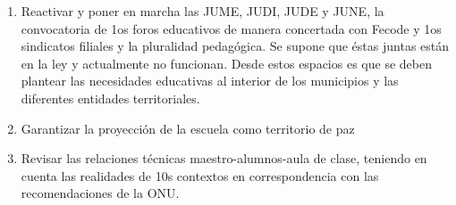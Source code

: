 \documentclass[10pt,twoside]{article}
\begin{document}
\begin{enumerate}
\begin{enumerate}
\item Reactivar y poner en marcha las JUME, JUDI, JUDE y JUNE, la
convocatoria de 1os foros educativos de manera concertada con
Fecode y 1os sindicatos filiales y la pluralidad pedagógica. Se supone que éstas juntas están en la ley y actualmente no funcionan. Desde estos espacios es que se deben plantear las necesidades educativas al interior de los municipios y las diferentes entidades territoriales.
\item Garantizar la proyección de la escuela como territorio de paz
\item Revisar las relaciones técnicas maestro-alumnos-aula de clase,
teniendo en cuenta las realidades de 10s contextos en
correspondencia con las recomendaciones de la ONU.
\end{enumerate}
\end{enumerate}
\end{document}
